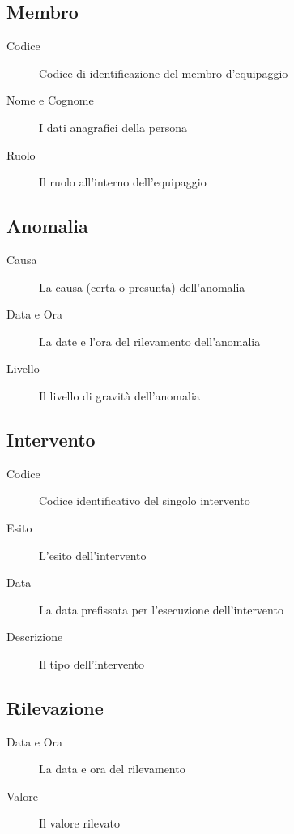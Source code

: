 \subsection{Membro}
\begin{description}
\item[Codice] Codice di identificazione del membro d'equipaggio
\item[Nome e Cognome] I dati anagrafici della persona
\item[Ruolo] Il ruolo all'interno dell'equipaggio
\end{description}
\subsection{Anomalia}
\begin{description}
\item[Causa] La causa (certa o presunta) dell'anomalia
\item[Data e Ora] La date e l'ora del rilevamento dell'anomalia
\item[Livello] Il livello di gravità dell'anomalia
\end{description}
\subsection{Intervento}
\begin{description}
\item[Codice] Codice identificativo del singolo intervento
\item[Esito] L'esito dell'intervento
\item[Data] La data prefissata per l'esecuzione dell'intervento
\item[Descrizione] Il tipo dell'intervento
\end{description}
\subsection{Rilevazione}
\begin{description}
\item[Data e Ora] La data e ora del rilevamento
\item[Valore] Il valore rilevato
\end{description}
